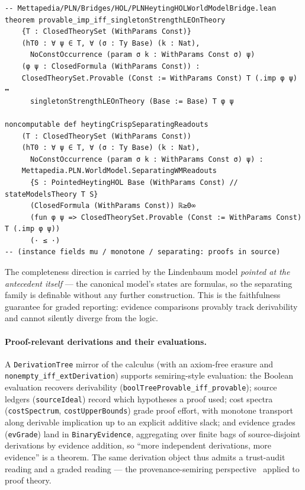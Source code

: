 \documentclass[11pt]{article}
\newcommand{\code}[1]{\texttt{#1}}
\newcommand{\BE}{\code{BinaryEvidence}}
\theoremstyle{plain}
\theoremstyle{definition}
\begin{document}
\begin{lstlisting}
-- Mettapedia/PLN/Bridges/HOL/PLNHeytingHOLWorldModelBridge.lean
theorem provable_imp_iff_singletonStrengthLEOnTheory
    {T : ClosedTheorySet (WithParams Const)}
    (hT0 : ∀ ψ ∈ T, ∀ (σ : Ty Base) (k : Nat),
      NoConstOccurrence (param σ k : WithParams Const σ) ψ)
    (φ ψ : ClosedFormula (WithParams Const)) :
    ClosedTheorySet.Provable (Const := WithParams Const) T (.imp φ ψ) ↔
      singletonStrengthLEOnTheory (Base := Base) T φ ψ

noncomputable def heytingCrispSeparatingReadouts
    (T : ClosedTheorySet (WithParams Const))
    (hT0 : ∀ ψ ∈ T, ∀ (σ : Ty Base) (k : Nat),
      NoConstOccurrence (param σ k : WithParams Const σ) ψ) :
    Mettapedia.PLN.WorldModel.SeparatingWMReadouts
      {S : PointedHeytingHOL Base (WithParams Const) // stateModelsTheory T S}
      (ClosedFormula (WithParams Const)) ℝ≥0∞
      (fun φ ψ => ClosedTheorySet.Provable (Const := WithParams Const) T (.imp φ ψ))
      (· ≤ ·)
-- (instance fields mu / monotone / separating: proofs in source)
\end{lstlisting}

The completeness direction is carried by the Lindenbaum model \emph{pointed
at the antecedent itself} --- the canonical model's states are formulas, so
the separating family is definable without any further construction.  This
is the faithfulness guarantee for graded reporting: evidence comparisons
provably track derivability and cannot silently diverge from the logic.

\paragraph{Proof-relevant derivations and their evaluations.}  A
\code{DerivationTree} mirror of the calculus (with an axiom-free erasure and
\code{nonempty\_iff\_extDerivation}) supports semiring-style evaluation: the
Boolean evaluation recovers derivability
(\code{boolTreeProvable\_iff\_provable}); source ledgers
(\code{sourceIdeal}) record which hypotheses a proof used; cost spectra
(\code{costSpectrum}, \code{costUpperBounds}) grade proof effort, with
monotone transport along derivable implication up to an explicit additive
slack; and evidence grades (\code{evGrade}) land in \BE{}, aggregating over
finite bags of source-disjoint derivations by evidence addition, so ``more
independent derivations, more evidence'' is a theorem.  The same derivation
object thus admits a trust-audit reading and a graded reading --- the
provenance-semiring perspective~\cite{provenance} applied to proof theory.
\end{document}
